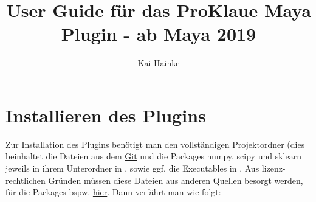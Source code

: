 \documentclass[a4paper, openany, oneside]{memoir}
\title{User Guide für das ProKlaue Maya Plugin - ab Maya 2019}
\author{Kai Hainke}
\begin{document}
\maketitle




  

\chapter{Installieren des Plugins}
Zur Installation des Plugins benötigt man den vollständigen Projektordner (dies beinhaltet die Dateien aus dem \href{https://github.com/EnReich/ProKlaue}{Git} und die Packages numpy, scipy und sklearn jeweils in ihrem Unterordner in , sowie ggf. die Executables in . Aus lizenz-rechtlichen Gründen müssen diese Dateien aus anderen Quellen besorgt werden, für die Packages bspw. \href{https://drive.google.com/drive/folders/0BwsYd1k8t0lEdHVqUWlueFpqRkE}{hier}. Dann verfährt man wie folgt:
\end{document}
